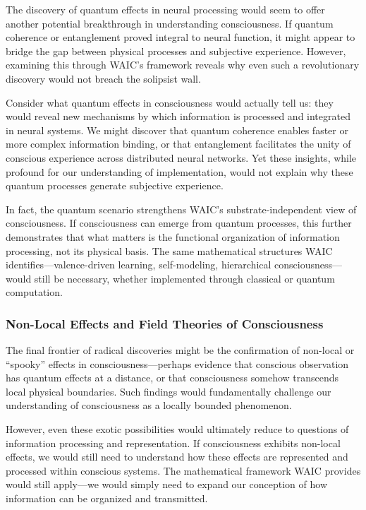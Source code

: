 \documentclass[12pt]{article}
\begin{document}
The discovery of quantum effects in neural processing would seem to offer another potential breakthrough in understanding consciousness. If quantum coherence or entanglement proved integral to neural function, it might appear to bridge the gap between physical processes and subjective experience. However, examining this through WAIC's framework reveals why even such a revolutionary discovery would not breach the solipsist wall.

Consider what quantum effects in consciousness would actually tell us: they would reveal new mechanisms by which information is processed and integrated in neural systems. We might discover that quantum coherence enables faster or more complex information binding, or that entanglement facilitates the unity of conscious experience across distributed neural networks. Yet these insights, while profound for our understanding of implementation, would not explain why these quantum processes generate subjective experience.

In fact, the quantum scenario strengthens WAIC's substrate-independent view of consciousness. If consciousness can emerge from quantum processes, this further demonstrates that what matters is the functional organization of information processing, not its physical basis. The same mathematical structures WAIC identifies---valence-driven learning, self-modeling, hierarchical consciousness---would still be necessary, whether implemented through classical or quantum computation.

\subsubsection{Non-Local Effects and Field Theories of Consciousness}

The final frontier of radical discoveries might be the confirmation of non-local or ``spooky'' effects in consciousness---perhaps evidence that conscious observation has quantum effects at a distance, or that consciousness somehow transcends local physical boundaries. Such findings would fundamentally challenge our understanding of consciousness as a locally bounded phenomenon.

However, even these exotic possibilities would ultimately reduce to questions of information processing and representation. If consciousness exhibits non-local effects, we would still need to understand how these effects are represented and processed within conscious systems. The mathematical framework WAIC provides would still apply---we would simply need to expand our conception of how information can be organized and transmitted.
\end{document}
